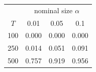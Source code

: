 % 
\begin{tabular}{cccc}
  \hline
  & \multicolumn{3}{c}{nominal size $\alpha$} \\
 $T$ & 0.01 & 0.05 & 0.1 \\
 \hline
100 & 0.000 & 0.000 & 0.000 \\ 
  250 & 0.014 & 0.051 & 0.091 \\ 
  500 & 0.757 & 0.919 & 0.956 \\ 
   \hline
\end{tabular}
